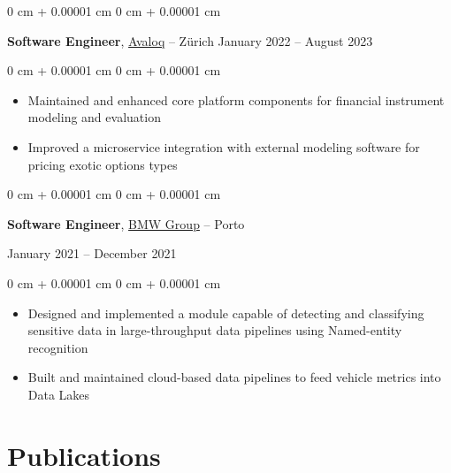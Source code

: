\documentclass[10pt, letterpaper]{article}
\newenvironment{highlights}{
    \begin{itemize}[
        topsep=0.10 cm,
        parsep=0.10 cm,
        partopsep=0pt,
        itemsep=0pt,
        leftmargin=0 cm + 10pt
    ]
}{
    \end{itemize}
} %
\newenvironment{onecolentry}{
    \begin{adjustwidth}{
        0 cm + 0.00001 cm
    }{
        0 cm + 0.00001 cm
    }
}{
    \end{adjustwidth}
} %
\newenvironment{twocolentry}[2][]{
    \onecolentry
    \def\secondColumn{#2}
    \setcolumnwidth{\fill, 4.5 cm}
    \begin{paracol}{2}
}{
    \switchcolumn \raggedleft \secondColumn
    \end{paracol}
    \endonecolentry
} %
\newenvironment{twocolbigentry}[2][]{
    \onecolentry
    \def\secondColumn{#2}
    \setcolumnwidth{\fill, 7 cm}
    \begin{paracol}{2}
}{
    \switchcolumn \raggedleft \secondColumn
    \end{paracol}
    \endonecolentry
} %
\begin{document}
        \vspace{0.1 cm}

        \begin{twocolentry}{
            January 2022 – August 2023
        }
            \textbf{Software Engineer}, \href{https://www.avaloq.com/}{Avaloq} -- Zürich\end{twocolentry}

        \vspace{0.10 cm}
        \begin{onecolentry}
            \begin{highlights}
                \item Maintained and enhanced core platform components for financial instrument modeling and evaluation
                \item Improved a microservice integration with external modeling software for pricing exotic options types
                
            \end{highlights}
        \end{onecolentry}

        \vspace{0.1 cm}

        \begin{twocolbigentry}{
            January 2021 – December 2021
        }
            \textbf{Software Engineer}, \href{https://www.criticaltechworks.com/}{BMW Group} -- Porto
        \end{twocolbigentry}

        \vspace{0.10 cm}
        \begin{onecolentry}
            \begin{highlights}
             \item Designed and implemented a module capable of detecting and classifying sensitive data in large-throughput data pipelines using Named-entity recognition
            \item Built and maintained cloud-based data pipelines to feed vehicle metrics into Data Lakes
               
            \end{highlights}
        \end{onecolentry}

    
    \section{Publications}
        
\end{document}
